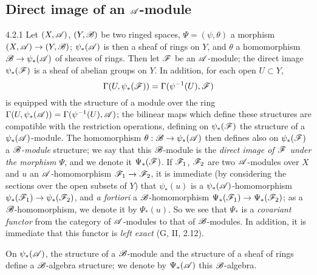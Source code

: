 \subsection{Direct image of an $\mathscr{A}$-module}
\label{0-prelim-4.2}

\begin{env}{4.2.1}
\label{env-0.4.2.1}
Let $(X,\mathscr{A})$, $(Y,\mathscr{B})$ be two ringed spaces, $\Psi=(\psi,\theta)$ a morphism
$(X,\mathscr{A})\to(Y,\mathscr{B})$; $\psi_*(\mathscr{A})$ is then a sheaf of rings on $Y$, and $\theta$ a
homomorphism $\mathscr{B}\to\psi_*(\mathscr{A})$ of sheaves of rings. Then let $\mathscr{F}$ be an
$\mathscr{A}$-module; the direct image $\psi_*(\mathscr{F})$ is a sheaf of abelian groups on $Y$. In
addition, for each open $U\subset Y$,
\[
  \Gamma(U,\psi_*(\mathscr{F}))=\Gamma(\psi^{-1}(U),\mathscr{F})
\]
is equipped with the structure of a module over the ring
$\Gamma(U,\psi_*(\mathscr{A}))=\Gamma(\psi^{-1}(U),\mathscr{A})$; the bilinear maps which define these
structures are compatible with the restriction operations, defining on $\psi_*(\mathscr{F})$ the
structure of a $\psi_*(\mathscr{A})$-module. The homomorphism $\theta:\mathscr{B}\to\psi_*(\mathscr{A})$
then defines also on $\psi_*(\mathscr{F})$ a \emph{$\mathscr{B}$-module} structure; we say that this
$\mathscr{B}$-module is the \emph{direct image of $\mathscr{F}$ under the morphism $\Psi$}, and we
denote it $\Psi_*(\mathscr{F})$. If $\mathscr{F}_1$, $\mathscr{F}_2$ are two $\mathscr{A}$-modules over $X$ and
$u$ an $\mathscr{A}$-homomorphism $\mathscr{F}_1\to\mathscr{F}_2$, it is immediate (by considering the
sections over the open subsets of $Y$) that $\psi_*(u)$ is a $\psi_*(\mathscr{A})$-homomorphism
$\psi_*(\mathscr{F}_1)\to\psi_*(\mathscr{F}_2)$, and \emph{a fortiori} a $\mathscr{B}$-homomorphism
$\Psi_*(\mathscr{F}_1)\to\Psi_*(\mathscr{F}_2)$; as a $\mathscr{B}$-homomorphism, we denote it by
$\Psi_*(u)$. So we see that $\Psi_*$ is a \emph{covariant functor} from the category of
$\mathscr{A}$-modules to that of $\mathscr{B}$-modules. In addition, it is immediate that this functor
is \emph{left exact} (G, II, 2.12).

On $\psi_*(\mathscr{A})$, the structure of a $\mathscr{B}$-module and the structure of a sheaf of rings
define a $\mathscr{B}$-algebra structure; we denote by $\Psi_*(\mathscr{A})$ this $\mathscr{B}$-algebra.
\end{env}


